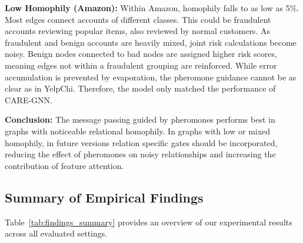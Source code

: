 \textbf{Low Homophily (Amazon):} Within Amazon, homophily falls to as low as 5\%. Most edges connect accounts of different classes. This could be fraudulent accounts reviewing popular items, also reviewed by normal customers. As fraudulent and benign accounts are heavily mixed, joint risk calculations become noisy. Benign nodes connected to bad nodes are assigned higher risk scores, meaning edges not within a fraudulent grouping are reinforced. While error accumulation is prevented by evaporation, the pheromone guidance cannot be as clear as in YelpChi. Therefore, the model only matched the performance of CARE-GNN.

\textbf{Conclusion:} The message passing guided by pheromones performs best in graphs with noticeable relational homophily. In graphs with low or mixed homophily, in future versions relation specific gates should be incorporated, reducing the effect of pheromones on noisy relationships and increasing the contribution of feature attention.

\subsection{Summary of Empirical Findings}

Table~\ref{tab:findings_summary} provides an overview of our experimental results across all evaluated settings.

